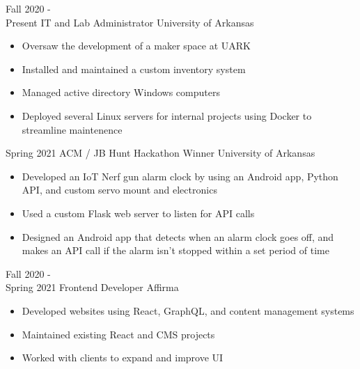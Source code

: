 \documentclass[9pt]{developercv} %
\begin{document}
\begin{entrylist}
	\entry
		{Fall 2020 -\vspace{4pt}\\Present}
		{IT and Lab Administrator}
		{University of Arkansas}
		{
			\vspace{-6pt}
			\begin{itemize}
				\item Oversaw the development of a maker space at UARK
				\item Installed and maintained a custom inventory system
				\item Managed active directory Windows computers
				\item Deployed several Linux servers for internal projects using Docker to streamline maintenence
			\end{itemize}
			\vspace{6pt}
		}

		\entry
		{Spring 2021}
		{ACM / JB Hunt Hackathon Winner}
		{University of Arkansas}
		{
			\vspace{-6pt}
			\begin{itemize}
				\item Developed an IoT Nerf gun alarm clock by using an Android app, Python API, and custom servo mount and electronics
				\item Used a custom Flask web server to listen for API calls
				\item Designed an Android app that detects when an alarm clock goes off, and makes an API call if the alarm isn't stopped within a set period of time
			\end{itemize}
			\vspace{6pt}
		}

		\entry
		{Fall 2020 -\vspace{4pt}\\Spring 2021}
		{Frontend Developer}
		{Affirma}
		{
			\vspace{-6pt}
			\begin{itemize}
				\item Developed websites using React, GraphQL, and content management systems
				\item Maintained existing React and CMS projects
				\item Worked with clients to expand and improve UI
			\end{itemize}
			\vspace{6pt}
		}
\end{entrylist}
\end{document}
